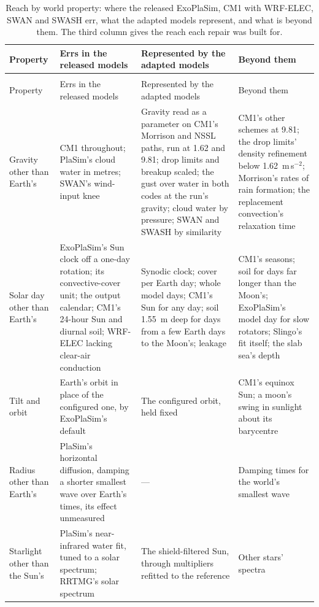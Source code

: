 {\footnotesize
\setlength{\tabcolsep}{4pt}
\renewcommand{\arraystretch}{1.08}
\begin{xltabular}{\textwidth}{@{}>{\raggedright\arraybackslash}p{0.15\textwidth}LLL@{}}
\caption{Reach by world property: where the released ExoPlaSim, CM1 with WRF-ELEC, SWAN and SWASH err, what the adapted
models represent, and what is beyond them. The third column gives the reach each repair was built for.}\label{tab:reach}\\
\toprule
Property & Errs in the released models & Represented by the adapted models & Beyond them \\
\midrule
\endfirsthead
{}\\
\toprule
Property & Errs in the released models & Represented by the adapted models & Beyond them \\
\midrule
\endhead
\bottomrule
\endlastfoot
Gravity other than Earth's & CM1 throughout; PlaSim's cloud water in metres; SWAN's wind-input knee & Gravity read as a parameter on CM1's Morrison and NSSL paths, run at 1.62 and 9.81; drop limits and breakup scaled; the gust over water in both codes at the run's gravity; cloud water by pressure; SWAN and SWASH by similarity & CM1's other schemes at 9.81; the drop limits' density refinement below 1.62~m\,s$^{-2}$; Morrison's rates of rain formation; the replacement convection's relaxation time \\
Solar day other than Earth's & ExoPlaSim's Sun clock off a one-day rotation; its convective-cover unit; the output calendar; CM1's 24-hour Sun and diurnal soil; WRF-ELEC lacking clear-air conduction & Synodic clock; cover per Earth day; whole model days; CM1's Sun for any day; soil 1.55~m deep for days from a few Earth days to the Moon's; leakage & CM1's seasons; soil for days far longer than the Moon's; ExoPlaSim's model day for slow rotators; Slingo's fit itself; the slab sea's depth \\
Tilt and orbit & Earth's orbit in place of the configured one, by ExoPlaSim's default & The configured orbit, held fixed & CM1's equinox Sun; a moon's swing in sunlight about its barycentre \\
Radius other than Earth's & PlaSim's horizontal diffusion, damping a shorter smallest wave over Earth's times, its effect unmeasured & --- & Damping times for the world's smallest wave \\
Starlight other than the Sun's & PlaSim's near-infrared water fit, tuned to a solar spectrum; RRTMG's solar spectrum & The shield-filtered Sun, through multipliers refitted to the reference & Other stars' spectra \\

\end{xltabular}}
